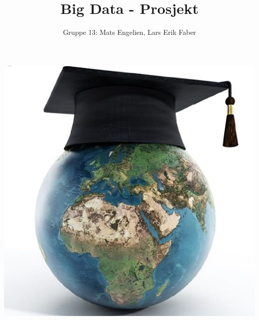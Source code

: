 \documentclass[12pt]{article}
\begin{document}
\title{Big Data - Prosjekt}
\author{Gruppe 13: Mats Engelien, Lars Erik Faber}
\date{}
\maketitle
\begin{center}
    \includegraphics[scale=0.5]{images/world_education.jpg}    
\end{center}
\thispagestyle{empty}
\newpage
\tableofcontents
\thispagestyle{empty}
\newpage
\setcounter{page}{1}








\end{document}
